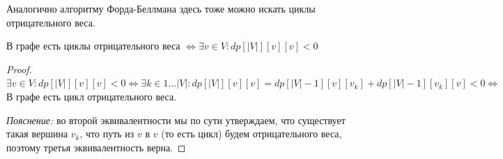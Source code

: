 Аналогично алгоритму Форда-Беллмана здесь тоже можно искать циклы отрицательного веса.

\Th В графе есть циклы отрицательного веса $\iff \exists v \in V: dp[|V|][v][v] < 0$
\begin{proof}
    $\exists v \in V: dp[|V|][v][v] < 0 \iff \exists k \in 1 \dots |V|: dp[|V|][v][v] = dp[|V| - 1][v][v_k] + dp[|V| - 1][v_k][v] < 0 \iff$ В графе есть цикл отрицательного веса.

    \textit{Пояснение:} во второй эквивалентности мы по сути утверждаем, что существует такая вершина $v_k$, что путь из $v$ в $v$ (то есть цикл) будем отрицательного веса, поэтому третья эквивалентность верна.
\end{proof}